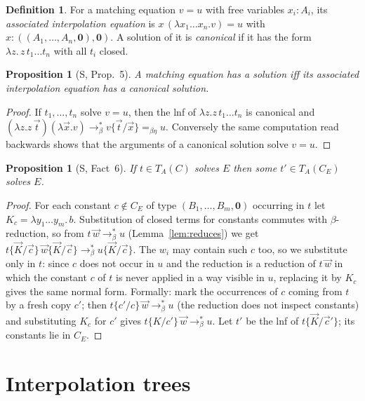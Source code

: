 \documentclass[11pt]{article}
\newcommand{\Ground}{\mathbf{0}}
\newcommand{\CE}{C_E}
\theoremstyle{plain}
\newtheorem{proposition}[theorem]{Proposition}
\theoremstyle{definition}
\newtheorem{definition}[theorem]{Definition}
\theoremstyle{remark}
\begin{document}
\begin{definition}
For a matching equation $v=u$ with free variables $x_i:A_i$, its
\emph{associated interpolation equation} is $x\,(\lambda x_1\dots
x_n.v)=u$ with $x:((A_1,\dots,A_n,\Ground),\Ground)$.  A solution of it
is \emph{canonical} if it has the form $\lambda z.\,z\,t_1\dots t_n$ with
all $t_i$ closed.
\end{definition}

\begin{proposition}[S, Prop.~5]\label{prop:canonical}
A matching equation has a solution iff its associated interpolation
equation has a canonical solution.
\end{proposition}
\begin{proof}
If $t_1,\dots,t_n$ solve $v=u$, then the lnf of $\lambda z.z\,t_1\dots t_n$
is canonical and $(\lambda z.z\,\vec t)(\lambda\vec x.v)\to_\beta^*
v\{\vec t/\vec x\}=_{\beta\eta}u$.  Conversely the same computation read
backwards shows that the arguments of a canonical solution solve $v=u$.
\end{proof}

\begin{proposition}[S, Fact~6]\label{prop:CE}
If $t\in T_A(C)$ solves $E$ then some $t'\in T_A(\CE)$ solves $E$.
\end{proposition}
\begin{proof}
For each constant $c\notin\CE$ of type $(B_1,\dots,B_m,\Ground)$ occurring
in $t$ let $K_c=\lambda y_1\dots y_m.\,b$.  Substitution of closed terms
for constants commutes with $\beta$-reduction, so from
$t\,\vec w\to_\beta^*u$ (Lemma~\ref{lem:reduces}) we get
$t\{\vec K/\vec c\}\,\vec w\{\vec K/\vec c\}\to_\beta^*u\{\vec K/\vec c\}$.
The $w_i$ may contain such $c$ too, so we substitute only in $t$: since
$c$ does not occur in $u$ and the reduction is a reduction of
$t\,\vec w$ in which the constant $c$ of $t$ is never applied in a
way visible in $u$, replacing it by $K_c$ gives the same normal form.
Formally: mark the occurrences of $c$ coming from $t$ by a fresh copy
$c'$; then $t\{c'/c\}\,\vec w\to_\beta^*u$ (the reduction does not
inspect constants) and substituting $K_c$ for $c'$ gives
$t\{K/c'\}\,\vec w\to_\beta^*u$.  Let $t'$ be the lnf of
$t\{\vec K/\vec c'\}$; its constants lie in $\CE$.
\end{proof}

\section{Interpolation trees}
\end{document}
